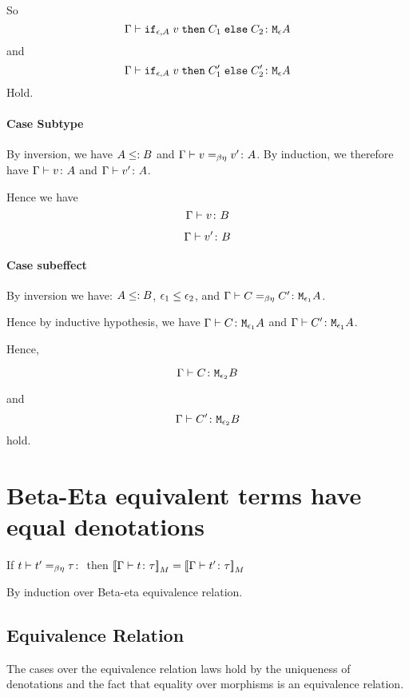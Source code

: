 {    So 
    \begin{equation}
        \Gamma \vdash \texttt{if}_{\epsilon, A}\; v\; \texttt{then}\; C_1 \;\texttt{else} \; C_2 \colon \texttt{M}_{\epsilon}{A}
    \end{equation}
    and
    \begin{equation}
        \Gamma \vdash \texttt{if}_{\epsilon, A}\; v\; \texttt{then}\; C_1' \;\texttt{else} \; C_2' \colon \texttt{M}_{\epsilon}{A}
    \end{equation}
    Hold.
    \paragraph{Case Subtype}

    By inversion, we have $A \leq: B$ and $\Gamma \vdash v =_{\beta\eta} v' \colon A$. By induction, we therefore have $\Gamma \vdash v \colon A$ and $\Gamma \vdash v' \colon A$.

    Hence we have 
    \begin{equation}
        \Gamma \vdash v \colon B
    \end{equation}

    
    \begin{equation}
        \Gamma \vdash v' \colon B
    \end{equation}
    \paragraph{Case subeffect}

    By inversion we have: $A \leq: B$, $\epsilon_1 \leq \epsilon_2$, and $\Gamma \vdash C =_{\beta\eta} C' \colon \texttt{M}_{\epsilon_1}{A}$.

    Hence by inductive hypothesis, we have $\Gamma \vdash C \colon \texttt{M}_{\epsilon_1}{A}$ and $\Gamma \vdash C' \colon \texttt{M}_{\epsilon_1}{A}$.

    Hence,

    \begin{equation}
        \Gamma \vdash C \colon \texttt{M}_{\epsilon_2}{B}
    \end{equation}

    and 
    \begin{equation}
        \Gamma \vdash C' \colon \texttt{M}_{\epsilon_2}{B}
    \end{equation}
    hold. 


    \section{Beta-Eta equivalent terms have equal denotations}
    If $\berelation{t}{t'}{\tau}$ then ${\bf [\![}\Gamma \vdash t \colon \tau{\bf ]\!]}_M = {\bf [\![}\Gamma \vdash t' \colon \tau{\bf ]\!]}_M$

    By induction over Beta-eta equivalence relation.
    \subsection{Equivalence Relation}
    The cases over the equivalence relation laws hold by the uniqueness of denotations and the fact that equality over morphisms is an equivalence relation.
}

